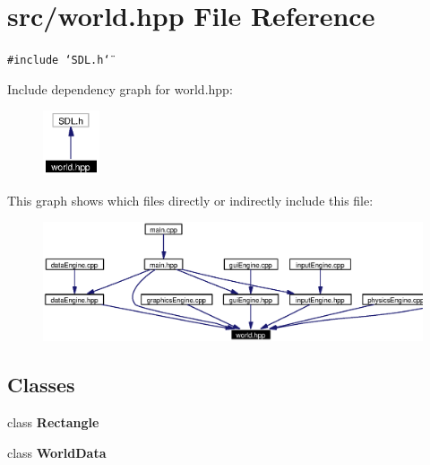 \section{src/world.hpp File Reference}
\label{world_8hpp}
{\tt \#include \char`\"{}SDL.h\char`\"{}}\par


Include dependency graph for world.hpp:\begin{figure}[H]
\begin{center}
\leavevmode
\includegraphics[width=47pt]{world_8hpp__incl}
\end{center}
\end{figure}


This graph shows which files directly or indirectly include this file:\begin{figure}[H]
\begin{center}
\leavevmode
\includegraphics[width=340pt]{world_8hpp__dep__incl}
\end{center}
\end{figure}
\subsection*{Classes}
\begin{CompactItemize}
\item 
class {\bf Rectangle}
\item 
class {\bf World\-Data}
\end{CompactItemize}
